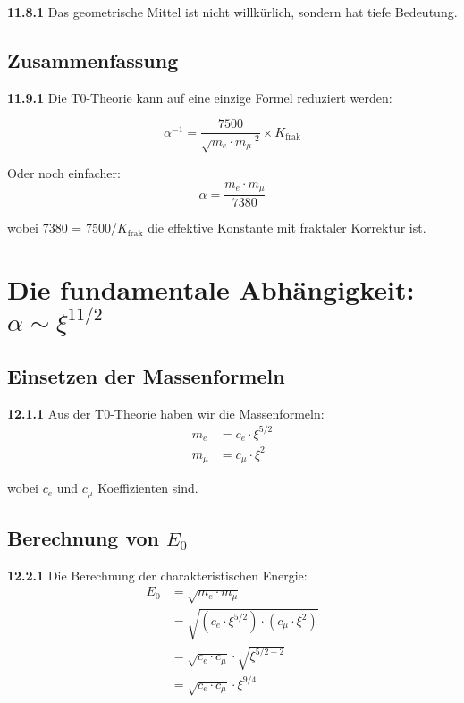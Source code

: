 \documentclass[12pt,a4paper]{article}
\newcommand{\kfrac}{K_{\text{frak}}}
\begin{document}
\noindent \textbf{11.8.1} Das geometrische Mittel ist nicht willkürlich, sondern hat tiefe Bedeutung.

\subsection{Zusammenfassung}

\begin{tcolorbox}[colback=blue!5!white,colframe=blue!75!black,title=\textbf{Die Essenz}]
	\noindent \textbf{11.9.1} Die T0-Theorie kann auf eine einzige Formel reduziert werden:
	
	\begin{equation}
		\boxed{\alpha^{-1} = \frac{7500}{\sqrt{m_e \cdot m_\mu}^2} \times K_{\text{frak}}}
	\end{equation}
	
	Oder noch einfacher:
	\begin{equation}
		\boxed{\alpha = \frac{m_e \cdot m_\mu}{7380}}
	\end{equation}
	
	wobei 7380 = 7500/$\kfrac$ die effektive Konstante mit fraktaler Korrektur ist.
\end{tcolorbox}
\section{Die fundamentale Abhängigkeit: $\alpha \sim \xi^{11/2}$}

\subsection{Einsetzen der Massenformeln}

\noindent \textbf{12.1.1} Aus der T0-Theorie haben wir die Massenformeln:
\begin{align}
	m_e &= c_e \cdot \xi^{5/2} \\
	m_\mu &= c_\mu \cdot \xi^2
\end{align}

wobei $c_e$ und $c_\mu$ Koeffizienten sind.

\subsection{Berechnung von $E_0$}

\noindent \textbf{12.2.1} Die Berechnung der charakteristischen Energie:
\begin{align}
	E_0 &= \sqrt{m_e \cdot m_\mu} \\
	&= \sqrt{(c_e \cdot \xi^{5/2}) \cdot (c_\mu \cdot \xi^2)} \\
	&= \sqrt{c_e \cdot c_\mu} \cdot \sqrt{\xi^{5/2 + 2}} \\
	&= \sqrt{c_e \cdot c_\mu} \cdot \xi^{9/4}
\end{align}
\end{document}
